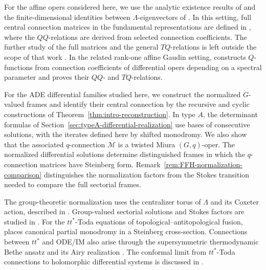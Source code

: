\documentclass[11pt,leqno]{amsart}
\numberwithin{equation}{section}
\theoremstyle{plain}
\theoremstyle{definition}
\theoremstyle{plain}
\theoremstyle{definition}
\theoremstyle{remark}
\begin{document}
For the affine opers considered here, we use the analytic existence results of \cite{MRV2016,MR2024,CGM2025} and the finite-dimensional identities between $\Lambda$-eigenvectors of \cite{MRV2016,MR2024}.  In this setting, full central connection matrices in the fundamental representations are defined in \cite{MR2024}, where the $QQ$-relations are derived from selected connection coefficients.  The further study of the full matrices and the general $TQ$-relations is left outside the scope of that work \cite{MR2024}.  In the related rank-one affine Gaudin setting, \cite{MasoeroMukhinRaimondo2025} constructs $Q$-functions from connection coefficients of differential opers depending on a spectral parameter and proves their $QQ$- and $TQ$-relations.

For the ADE differential families studied here, we construct the normalized $G$-valued frames and identify their central connection by the recursive and cyclic constructions of Theorem~\ref{thm:intro-reconstruction}.  In type $A$, the determinant formulas of Section~\ref{sec:typeA-differential-realization} use bases of consecutive solutions, with the iterates defined here by shifted monodromy.  We also show that the associated $q$-connection $\mathscr M$ is a twisted Miura $(G,q)$-oper.  The normalized differential solutions determine distinguished frames in which the $q$-connection matrices have Steinberg form.  Remark~\ref{rem:FFH-normalization-comparison} distinguishes the normalization factors from the Stokes transition needed to compare the full sectorial frames.

The group-theoretic normalization uses the centralizer torus of $\Lambda$ and its Coxeter action, described in \cite{Kostant1959,Steinberg1959}.  Group-valued sectorial solutions and Stokes factors are studied in \cite{Boalch2002}.  For the $tt^*$-Toda equations of topological--antitopological fusion, \cite{GuestHo2019} places canonical partial monodromy in a Steinberg cross-section.  Connections between $tt^*$ and ODE/IM also arise through the supersymmetric thermodynamic Bethe ansatz \cite{CecottiFendleyIntriligatorVafa1992} and its Airy realization \cite{Fendley1999}.  The conformal limit from $tt^*$-Toda connections to holomorphic differential systems is discussed in \cite{Guest2021}.
\end{document}
